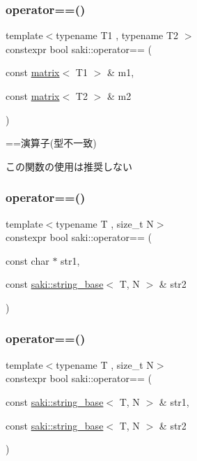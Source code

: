 \subsubsection{\texorpdfstring{operator==()}{operator==()}\hspace{0.1cm}{\footnotesize\ttfamily [12/14]}}
{\footnotesize\ttfamily template$<$typename T1 , typename T2 $>$ \\
constexpr bool saki\+::operator== (\begin{DoxyParamCaption}\item[{const \mbox{\hyperlink{classsaki_1_1matrix}{matrix}}$<$ T1 $>$ \&}]{m1,  }\item[{const \mbox{\hyperlink{classsaki_1_1matrix}{matrix}}$<$ T2 $>$ \&}]{m2 }\end{DoxyParamCaption})}



==演算子(型不一致) 

この関数の使用は推奨しない \mbox{\label{namespacesaki_aeab22d0272e78c7d3a44ce241259c996}} 
\subsubsection{\texorpdfstring{operator==()}{operator==()}\hspace{0.1cm}{\footnotesize\ttfamily [13/14]}}
{\footnotesize\ttfamily template$<$typename T , size\+\_\+t N$>$ \\
constexpr bool saki\+::operator== (\begin{DoxyParamCaption}\item[{const char $\ast$}]{str1,  }\item[{const \mbox{\hyperlink{classsaki_1_1string__base}{saki\+::string\+\_\+base}}$<$ T, N $>$ \&}]{str2 }\end{DoxyParamCaption})}

\mbox{\label{namespacesaki_a69af90ebb2b8a4f7bf399a381a8898c9}} 
\subsubsection{\texorpdfstring{operator==()}{operator==()}\hspace{0.1cm}{\footnotesize\ttfamily [14/14]}}
{\footnotesize\ttfamily template$<$typename T , size\+\_\+t N$>$ \\
constexpr bool saki\+::operator== (\begin{DoxyParamCaption}\item[{const \mbox{\hyperlink{classsaki_1_1string__base}{saki\+::string\+\_\+base}}$<$ T, N $>$ \&}]{str1,  }\item[{const \mbox{\hyperlink{classsaki_1_1string__base}{saki\+::string\+\_\+base}}$<$ T, N $>$ \&}]{str2 }\end{DoxyParamCaption})}

